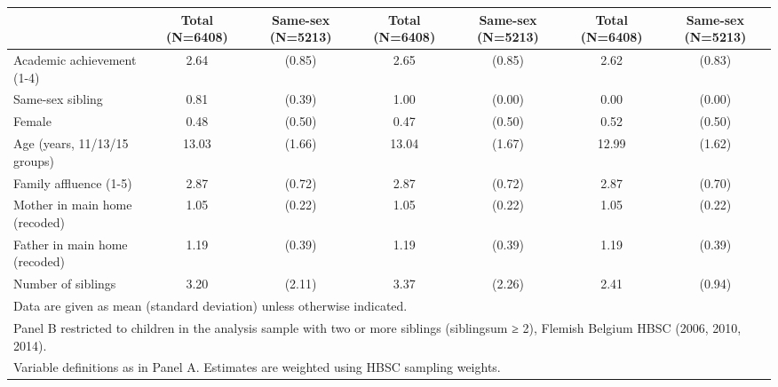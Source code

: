 {
\def\sym#1{\ifmmode^{#1}\else\(^{#1}\)\fi}
\begin{tabular}{l*{3}{cc}}
\hline\hline
                    &Total (N=6408)&Same-sex (N=5213)&Total (N=6408)&Same-sex (N=5213)&Total (N=6408)&Same-sex (N=5213)\\
\hline
Academic achievement (1-4)&        2.64&      (0.85)&        2.65&      (0.85)&        2.62&      (0.83)\\
Same-sex sibling    &        0.81&      (0.39)&        1.00&      (0.00)&        0.00&      (0.00)\\
Female              &        0.48&      (0.50)&        0.47&      (0.50)&        0.52&      (0.50)\\
Age (years, 11/13/15 groups)&       13.03&      (1.66)&       13.04&      (1.67)&       12.99&      (1.62)\\
Family affluence (1-5)&        2.87&      (0.72)&        2.87&      (0.72)&        2.87&      (0.70)\\
Mother in main home (recoded)&        1.05&      (0.22)&        1.05&      (0.22)&        1.05&      (0.22)\\
Father in main home (recoded)&        1.19&      (0.39)&        1.19&      (0.39)&        1.19&      (0.39)\\
Number of siblings  &        3.20&      (2.11)&        3.37&      (2.26)&        2.41&      (0.94)\\
\hline\hline
\multicolumn{7}{l}{\footnotesize Data are given as mean (standard deviation) unless otherwise indicated.}\\
\multicolumn{7}{l}{\footnotesize Panel B restricted to children in the analysis sample with two or more siblings (siblingsum ≥ 2), Flemish Belgium HBSC (2006, 2010, 2014).}\\
\multicolumn{7}{l}{\footnotesize Variable definitions as in Panel A. Estimates are weighted using HBSC sampling weights.}\\
\end{tabular}
}
